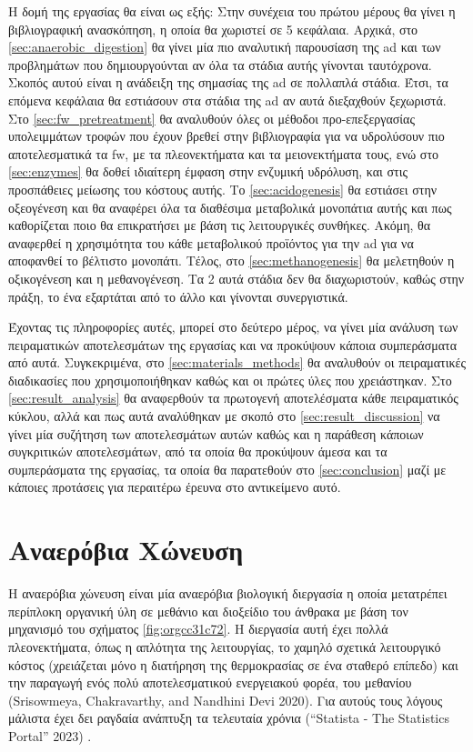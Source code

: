 \documentclass[11pt]{report}
\makeatletter
\newcommand{\citeprocitem}[2]{\hyper@linkstart{cite}{citeproc_bib_item_#1}#2\hyper@linkend}
\makeatother
\begin{document}
Η δομή της εργασίας θα είναι ως εξής: Στην συνέχεια του πρώτου μέρους θα γίνει η βιβλιογραφική ανασκόπηση, η οποία θα χωριστεί σε 5 κεφάλαια. Αρχικά, στο \autoref{sec:anaerobic_digestion} θα γίνει μία πιο αναλυτική παρουσίαση της \acrshort{ad} και των προβλημάτων που δημιουργούνται αν όλα τα στάδια αυτής γίνονται ταυτόχρονα. Σκοπός αυτού είναι η ανάδειξη της σημασίας της \acrshort{ad} σε πολλαπλά στάδια. Έτσι, τα επόμενα κεφάλαια θα εστιάσουν στα στάδια της \acrshort{ad} αν αυτά διεξαχθούν ξεχωριστά. Στο \autoref{sec:fw_pretreatment} θα αναλυθούν όλες οι μέθοδοι προ-επεξεργασίας υπολειμμάτων τροφών που έχουν βρεθεί στην βιβλιογραφία για να υδρολύσουν πιο αποτελεσματικά τα \acrshort{fw}, με τα πλεονεκτήματα και τα μειονεκτήματα τους, ενώ στο \autoref{sec:enzymes} θα δοθεί ιδιαίτερη έμφαση στην ενζυμική υδρόλυση, και στις προσπάθειες μείωσης του κόστους αυτής. Το \autoref{sec:acidogenesis} θα εστιάσει στην οξεογένεση και θα αναφέρει όλα τα διαθέσιμα μεταβολικά μονοπάτια αυτής και πως καθορίζεται ποιο θα επικρατήσει με βάση τις λειτουργικές συνθήκες. Ακόμη, θα αναφερθεί η χρησιμότητα του κάθε μεταβολικού προϊόντος για την \acrshort{ad} για να αποφανθεί το βέλτιστο μονοπάτι. Τέλος, στο \autoref{sec:methanogenesis} θα μελετηθούν η οξικογένεση και η μεθανογένεση. Τα 2 αυτά στάδια δεν θα διαχωριστούν, καθώς στην πράξη, το ένα εξαρτάται από το άλλο και γίνονται συνεργιστικά.

Έχοντας τις πληροφορίες αυτές, μπορεί στο δεύτερο μέρος, να γίνει μία ανάλυση των πειραματικών αποτελεσμάτων της εργασίας και να προκύψουν κάποια συμπεράσματα από αυτά. Συγκεκριμένα, στο \autoref{sec:materials_methods} θα αναλυθούν οι πειραματικές διαδικασίες που χρησιμοποιήθηκαν καθώς και οι πρώτες ύλες που χρειάστηκαν. Στο \autoref{sec:result_analysis} θα αναφερθούν τα πρωτογενή αποτελέσματα κάθε πειραματικός κύκλου, αλλά και πως αυτά αναλύθηκαν με σκοπό στο \autoref{sec:result_discussion} να γίνει μία συζήτηση των αποτελεσμάτων αυτών καθώς και η παράθεση κάποιων συγκριτικών αποτελεσμάτων, από τα οποία θα προκύψουν άμεσα και τα συμπεράσματα της εργασίας, τα οποία θα παρατεθούν στο \autoref{sec:conclusion} μαζί με κάποιες προτάσεις για περαιτέρω έρευνα στο αντικείμενο αυτό.

\chapter{Αναερόβια Χώνευση}
\label{sec:orged80762}
\label{sec:anaerobic_digestion}

Η αναερόβια χώνευση είναι μία αναερόβια βιολογική διεργασία η οποία μετατρέπει περίπλοκη οργανική ύλη σε μεθάνιο και διοξείδιο του άνθρακα με βάση τον μηχανισμό του σχήματος \ref{fig:orgcc31c72}. Η διεργασία αυτή έχει πολλά πλεονεκτήματα, όπως η απλότητα της λειτουργίας, το χαμηλό σχετικά λειτουργικό κόστος (χρειάζεται μόνο η διατήρηση της θερμοκρασίας σε ένα σταθερό επίπεδο) και την παραγωγή ενός πολύ αποτελεσματικού ενεργειακού φορέα, του μεθανίου (\citeprocitem{68}{Srisowmeya, Chakravarthy, and Nandhini Devi 2020}). Για αυτούς τους λόγους μάλιστα έχει δει ραγδαία ανάπτυξη τα τελευταία χρόνια (\citeprocitem{69}{“Statista - The Statistics Portal” 2023}) .
\end{document}
